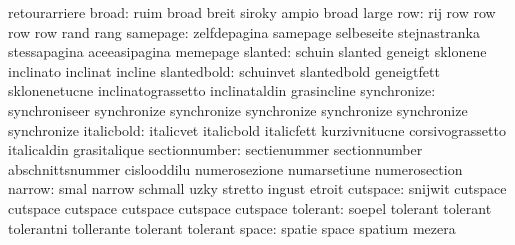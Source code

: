                            retourarriere
                    broad: ruim                      broad
                           breit                     siroky
                           ampio                     broad
                           large
                      row: rij                       row
                           row                       row
                           row                       rand
                           rang
                 samepage: zelfdepagina              samepage
                           selbeseite                stejnastranka
                           stessapagina              aceeasipagina
                           memepage
                  slanted: schuin                    slanted
                           geneigt                   sklonene
                           inclinato                 inclinat
                           incline
              slantedbold: schuinvet                 slantedbold
                           geneigtfett               sklonenetucne
                           inclinatograssetto        inclinataldin
                           grasincline
              synchronize: synchroniseer             synchronize
                           synchronize               synchronize
                           synchronize               synchronize
                           synchronize
               italicbold: italicvet                 italicbold
                           italicfett                kurzivnitucne
                           corsivograssetto          italicaldin
                           grasitalique
            sectionnumber: sectienummer              sectionnumber
                           abschnittsnummer          cislooddilu
                           numerosezione             numarsetiune
                           numerosection
                   narrow: smal                      narrow
                           schmall                   uzky
                           stretto                   ingust
                           etroit
                 cutspace: snijwit                   cutspace
                           cutspace                  cutspace
                           cutspace                  cutspace
                           cutspace
                 tolerant: soepel                    tolerant
                           tolerant                  tolerantni
                           tollerante                tolerant
                           tolerant
                    space: spatie                    space
                           spatium                   mezera
